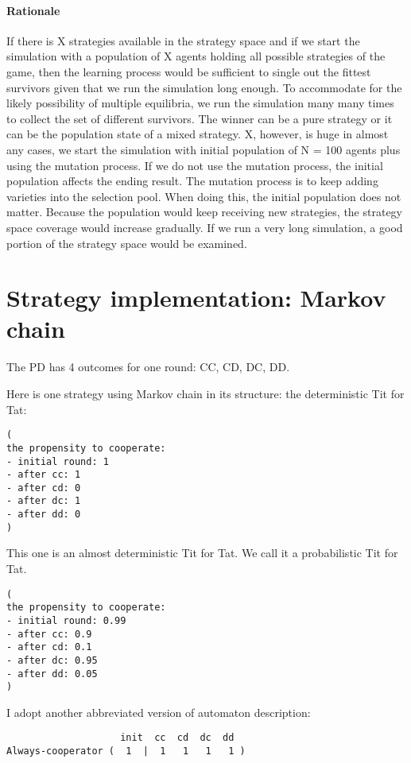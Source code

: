\documentclass[12.5pt]{report}
\begin{document}
\paragraph{Rationale}

If there is X strategies available in the strategy space and if we start the simulation with a population of X agents holding all possible strategies of the game, then the learning process would be sufficient to single out the fittest survivors given that we run the simulation long enough. To accommodate for the likely possibility of multiple equilibria, we run the simulation many many times to collect the set of different survivors. The winner can be a pure strategy or it can be the population state of a mixed strategy. X, however, is huge in almost any cases, we start the simulation with initial population of N = 100 agents plus using the mutation process. If we do not use the mutation process, the initial population affects the ending result. The mutation process is to keep adding varieties into the selection pool. When doing this, the initial population does not matter. Because the population would keep receiving new strategies, the strategy space coverage would increase gradually. If we run a very long simulation, a good portion of the strategy space would be examined. 

\section{Strategy implementation: Markov chain}

The PD has 4 outcomes for one round: CC, CD, DC, DD.

Here is one strategy using Markov chain in its structure: the deterministic Tit for Tat:

\begin{verbatim}
(
the propensity to cooperate:
- initial round: 1
- after cc: 1
- after cd: 0 
- after dc: 1 
- after dd: 0
)
\end{verbatim}

This one is an almost deterministic Tit for Tat. We call it a probabilistic Tit for Tat.
\begin{verbatim}
(
the propensity to cooperate:
- initial round: 0.99
- after cc: 0.9
- after cd: 0.1
- after dc: 0.95
- after dd: 0.05
)
\end{verbatim}

I adopt another abbreviated version of automaton description:

\begin{verbatim}
                    init  cc  cd  dc  dd 
Always-cooperator (  1  |  1   1   1   1 )
\end{verbatim}
\end{document}
